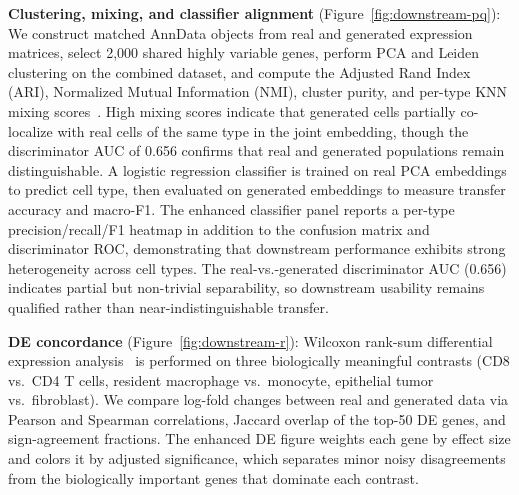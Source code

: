 \documentclass[genes,article,submit,pdftex,oneauthor]{Definitions/mdpi}
\begin{document}
\textbf{Clustering, mixing, and classifier alignment} (Figure~\ref{fig:downstream-pq}): We construct matched AnnData objects from real and generated expression matrices, select 2,000 shared highly variable genes, perform PCA and Leiden~\cite{ref-leiden} clustering on the combined dataset, and compute the Adjusted Rand Index (ARI), Normalized Mutual Information (NMI), cluster purity, and per-type KNN mixing scores~\cite{ref-integration-benchmark}. High mixing scores indicate that generated cells partially co-localize with real cells of the same type in the joint embedding, though the discriminator AUC of 0.656 confirms that real and generated populations remain distinguishable. A logistic regression classifier is trained on real PCA embeddings to predict cell type, then evaluated on generated embeddings to measure transfer accuracy and macro-F1. The enhanced classifier panel reports a per-type precision/recall/F1 heatmap in addition to the confusion matrix and discriminator ROC, demonstrating that downstream performance exhibits strong heterogeneity across cell types. The real-vs.-generated discriminator AUC (0.656) indicates partial but non-trivial separability, so downstream usability remains qualified rather than near-indistinguishable transfer.

\textbf{DE concordance} (Figure~\ref{fig:downstream-r}): Wilcoxon rank-sum differential expression analysis~\cite{ref-wilcoxon} is performed on three biologically meaningful contrasts (CD8 vs.\ CD4 T cells, resident macrophage vs.\ monocyte, epithelial tumor vs.\ fibroblast). We compare log-fold changes between real and generated data via Pearson and Spearman correlations, Jaccard overlap of the top-50 DE genes, and sign-agreement fractions. The enhanced DE figure weights each gene by effect size and colors it by adjusted significance, which separates minor noisy disagreements from the biologically important genes that dominate each contrast.
\end{document}
